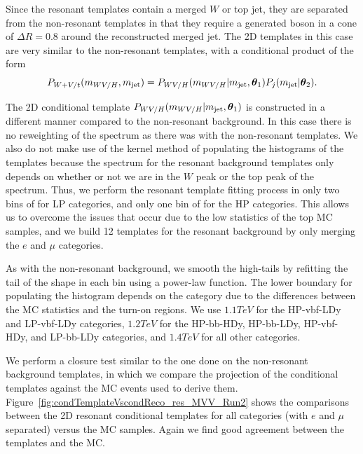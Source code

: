 Since the resonant templates contain a merged $W$ or top jet, they are separated from the non-resonant templates in that they require a generated boson in a cone of $\Delta R=0.8$ around the reconstructed merged jet.
The 2D templates in this case are very similar to the non-resonant templates, with a conditional product of the form
\begin{equation}
  P_{W+V/t}(m_{WV/H},m_\mathrm{jet})=P_{WV/H}(m_{WV/H}|m_\mathrm{jet},\vb*{\theta}_1)P_j(m_\mathrm{jet}|\vb*{\theta}_2).
\end{equation}

The 2D conditional template $P_{WV/H}(m_{WV/H}|m_\mathrm{jet},\vb*{\theta}_1)$ is constructed in a different manner compared to the non-resonant background.
In this case there is no reweighting of the \MVV spectrum as there was with the non-resonant templates.
We also do not make use of the kernel method of populating the histograms of the templates because the \MVV spectrum for the resonant background templates only depends on whether or not we are in the $W$ peak or the top peak of the \MJ spectrum.
Thus, we perform the resonant template fitting process in only two bins of \MJ for LP categories, and only one bin of \MJ for the HP categories.
This allows us to overcome the issues that occur due to the low statistics of the top MC samples, and we build 12 templates for the resonant background by only merging the $e$ and $\mu$ categories.

As with the non-resonant background, we smooth the high-\MVV tails by refitting the tail of the \MVV shape in each \MJ bin using a power-law function.
The lower boundary for populating the histogram depends on the category due to the differences between the MC statistics and the turn-on regions.
We use $1.1\unit{TeV}$ for the HP-vbf-LDy and LP-vbf-LDy categories, $1.2\unit{TeV}$ for the HP-bb-HDy, HP-bb-LDy, HP-vbf-HDy, and LP-bb-LDy categories, and $1.4\unit{TeV}$ for all other categories.

We perform a closure test similar to the one done on the non-resonant background templates, in which we compare the \MVV projection of the conditional templates against the MC events used to derive them.
Figure~\ref{fig:condTemplateVscondReco_res_MVV_Run2} shows the comparisons between the 2D resonant conditional templates for all categories (with $e$ and $\mu$ separated) versus the MC samples.
Again we find good agreement between the templates and the MC.

